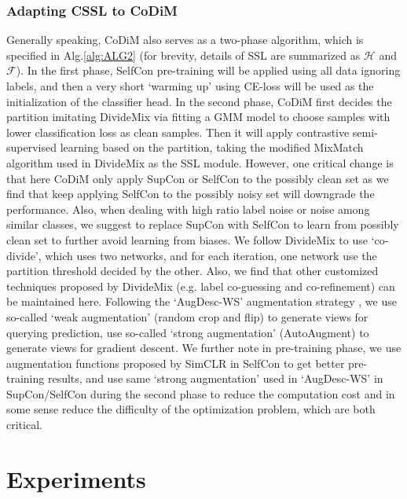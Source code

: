 \documentclass[letterpaper]{article} \usepackage{aaai22}  \usepackage{times}  \usepackage{helvet}  \usepackage{courier}  \usepackage[hyphens]{url}  \usepackage{graphicx} \usepackage{subfigure}
\begin{document}
\subsubsection{Adapting CSSL to CoDiM}
Generally speaking, CoDiM also serves as a two-phase algorithm, which is specified in Alg.\ref{alg:ALG2} (for brevity, details of SSL are summarized as $\mathcal{H}$ and $\mathcal{F}$). In the first phase, SelfCon pre-training will be applied using all data ignoring labels, and then a very short `warming up' using CE-loss will be used as the initialization of the classifier head. In the second phase, CoDiM first decides the partition imitating DivideMix via fitting a GMM model to choose samples with lower classification loss as clean samples. Then it will apply contrastive semi-supervised learning based on the partition, taking the modified MixMatch algorithm used in DivideMix as the SSL module. However, one critical change is that here CoDiM only apply SupCon or SelfCon to the possibly clean set as we find that keep applying SelfCon to the possibly noisy set will downgrade the performance. Also, when dealing with high ratio label noise or noise among similar classes, we suggest to replace SupCon with SelfCon to learn from possibly clean set to further avoid learning from biases. We follow DivideMix to use `co-divide', which uses two networks, and for each iteration, one network use the partition threshold decided by the other. Also, we find that other customized techniques proposed by DivideMix (e.g. label co-guessing and co-refinement) can be maintained here. Following the `AugDesc-WS' augmentation strategy \cite{nishi2021augmentation}, we use so-called `weak augmentation' (random crop and flip) to generate views for querying prediction, use so-called `strong augmentation' (AutoAugment) to generate views for gradient descent. We further note in pre-training phase, we use augmentation functions proposed by SimCLR \cite{chen2020simple} in SelfCon to get better pre-training results, and use same `strong augmentation' used in `AugDesc-WS' in SupCon/SelfCon during the second phase to reduce the computation cost and in some sense reduce the difficulty of the optimization problem, which are both critical.
\section{Experiments}
\end{document}
